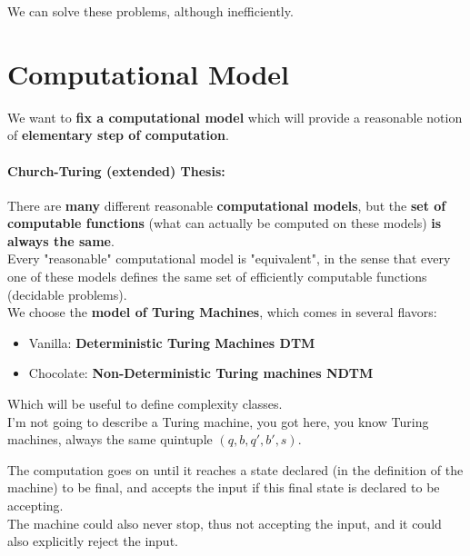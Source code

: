 	We can solve these problems, although inefficiently.\\

	\section{Computational Model}
	We want to \textbf{fix a computational model} which will provide a reasonable notion of \textbf{elementary step of computation}.\\

	\paragraph{Church-Turing (extended) Thesis:} There are \textbf{many} different reasonable \textbf{computational models}, but the \textbf{set of computable functions} (what can actually be computed on these models) \textbf{is always the same}. \\
	Every "reasonable" computational model is "equivalent", in the sense that every one of these models defines the same set of efficiently computable functions (decidable problems).\\

	We choose the \textbf{model of Turing Machines}, which comes in several flavors:
	\begin{itemize}
		\item Vanilla: \textbf{Deterministic Turing Machines DTM}
		\item Chocolate: \textbf{Non-Deterministic Turing machines NDTM}
	\end{itemize}

	Which will be useful to define complexity classes.\\

	I'm not going to describe a Turing machine, you got here, you know Turing machines, always the same quintuple $(q,b,q',b',s)$.\\

	\newpage

	The computation goes on until it reaches a state declared (in the definition of the machine) to be final, and accepts the input if this final state is declared to be accepting.\\
	The machine could also never stop, thus not accepting the input, and it could also explicitly reject the input.\\


